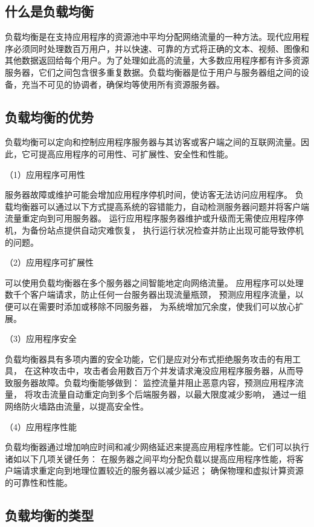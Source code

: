 \subsection{什么是负载均衡}

负载均衡是在支持应用程序的资源池中平均分配网络流量的一种方法。现代应用程序必须同时处理数百万用户，并以快速、可靠的方式将正确的文本、视频、图像和其他数据返回给每个用户。为了处理如此高的流量，大多数应用程序都有许多资源服务器，它们之间包含很多重复数据。负载均衡器是位于用户与服务器组之间的设备，充当不可见的协调者，确保均等使用所有资源服务器。

\subsection{负载均衡的优势}

负载均衡可以定向和控制应用程序服务器与其访客或客户端之间的互联网流量。因此，它可提高应用程序的可用性、可扩展性、安全性和性能。

（1）应用程序可用性

服务器故障或维护可能会增加应用程序停机时间，使访客无法访问应用程序。
负载均衡器可以通过以下方式提高系统的容错能力，自动检测服务器问题并将客户端流量重定向到可用服务器。
运行应用程序服务器维护或升级而无需使应用程序停机，为备份站点提供自动灾难恢复，
执行运行状况检查并防止出现可能导致停机的问题。

（2）应用程序可扩展性

可以使用负载均衡器在多个服务器之间智能地定向网络流量。
应用程序可以处理数千个客户端请求，防止任何一台服务器出现流量瓶颈，
预测应用程序流量，以便可以在需要时添加或移除不同服务器，
为系统增加冗余度，使我们可以放心扩展。

（3）应用程序安全

负载均衡器具有多项内置的安全功能，它们是应对分布式拒绝服务攻击的有用工具，
在这种攻击中，攻击者会用数百万个并发请求淹没应用程序服务器，从而导致服务器故障。负载均衡能够做到：
监控流量并阻止恶意内容，预测应用程序流量，
将攻击流量自动重定向到多个后端服务器，以最大限度减少影响，
通过一组网络防火墙路由流量，以提高安全性。

（4）应用程序性能

负载均衡器通过增加响应时间和减少网络延迟来提高应用程序性能。它们可以执行诸如以下几项关键任务：
在服务器之间平均分配负载以提高应用程序性能，将客户端请求重定向到地理位置较近的服务器以减少延迟；
确保物理和虚拟计算资源的可靠性和性能。

\subsection{负载均衡的类型}

